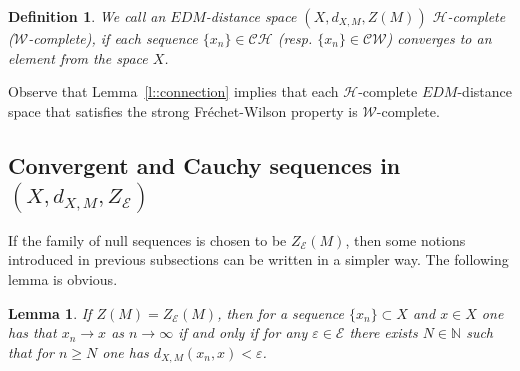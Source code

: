 \documentclass[12pt]{amsart}          %
\newtheorem{lemma}{Lemma}
\newtheorem{definition}{Definition}
\newcommand{\NN}{\mathbb N}
\newcommand{\EE}{\mathcal{E}}
\begin{document}
 \begin{definition}
We call an $EDM$-distance space $(X,d_{X,M}, Z(M))$ $\mathcal{H}$-complete ($\mathcal{W}$-complete), if each sequence $\{x_n\}\in \mathcal{CH}$ (resp. $\{x_n\}\in \mathcal{CW}$)  converges to an element from the space $X$.
\end{definition}
Observe that Lemma~\ref{l::connection} implies that each $\mathcal{H}$-complete $EDM$-distance space that satisfies the strong Fr\'{e}chet-Wilson property is $\mathcal{W}$-complete.


\subsection{Convergent and Cauchy sequences in $(X,d_{X,M},Z_{\EE})$}

If the family of null sequences is chosen to be $Z_{\EE}(M)$, then some notions introduced in previous subsections can be written in a simpler way. The following lemma is obvious. 
\begin{lemma}\label{l::econvergence}
If $Z(M) = Z_{\EE}(M)$, then for a sequence $\{ x_n\}\subset X$ and $x\in X$ one has that $x_n\to x$ {as} $n\to\infty$ if and only if for any $\varepsilon\in \EE$ there exists $N\in\NN$ such that for $n\geq N$ one has $d_{X,M}(x_n,x)< \varepsilon$.
\end{lemma}
\end{document}
